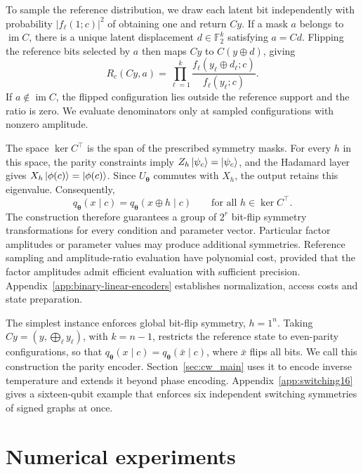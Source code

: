 \documentclass[pra,aps,10pt,twocolumn,floatfix,superscriptaddress, notitlepage,longbibliography]{revtex4-2}
\begin{document}
To sample the reference distribution, we draw each latent bit independently with probability $|f_\ell(1;c)|^2$ of obtaining one and return $Cy$. If a mask $a$ belongs to $\operatorname{im}C$, there is a unique latent displacement $d\in\mathbb F_2^k$ satisfying $a=Cd$. Flipping the reference bits selected by $a$ then maps $Cy$ to $C(y\oplus d)$, giving
\begin{equation}
    R_c(Cy,a)=\prod_{\ell=1}^k
    \frac{f_\ell(y_\ell\oplus d_\ell;c)}{f_\ell(y_\ell;c)}.
    \label{eq:binary-linear-ratio}
\end{equation}
If $a\notin\operatorname{im}C$, the flipped configuration lies outside the reference support and the ratio is zero. We evaluate denominators only at sampled configurations with nonzero amplitude.

The space $\ker C^\top$ is the span of the prescribed symmetry masks. For every $h$ in this space, the parity constraints imply $Z_h\ket{\psi_c}=\ket{\psi_c}$, and the Hadamard layer gives $X_h\ket{\phi(c)}=\ket{\phi(c)}$. Since $U_{\boldsymbol\theta}$ commutes with $X_h$, the output retains this eigenvalue. Consequently,
\begin{equation}
    q_{\boldsymbol\theta}(x\mid c)
    =q_{\boldsymbol\theta}(x\oplus h\mid c)
    \qquad\text{for all }h\in\ker C^\top.
    \label{eq:binary-linear-symmetry}
\end{equation}
The construction therefore guarantees a group of $2^r$ bit-flip symmetry transformations for every condition and parameter vector. Particular factor amplitudes or parameter values may produce additional symmetries. Reference sampling and amplitude-ratio evaluation have polynomial cost, provided that the factor amplitudes admit efficient evaluation with sufficient precision. Appendix~\ref{app:binary-linear-encoders} establishes normalization, access costs and state preparation.

The simplest instance enforces global bit-flip symmetry, $h=1^n$. Taking $Cy=(y,\bigoplus_\ell y_\ell)$, with $k=n-1$, restricts the reference state to even-parity configurations, so that $q_{\boldsymbol\theta}(x\mid c)=q_{\boldsymbol\theta}(\bar x\mid c)$, where $\bar x$ flips all bits. We call this construction the parity encoder. Section~\ref{sec:cw_main} uses it to encode inverse temperature and extends it beyond phase encoding. Appendix~\ref{app:switching16} gives a sixteen-qubit example that enforces six independent switching symmetries of signed graphs at once.

\section{Numerical experiments}
\label{sec:numerical-experiments}
\end{document}
